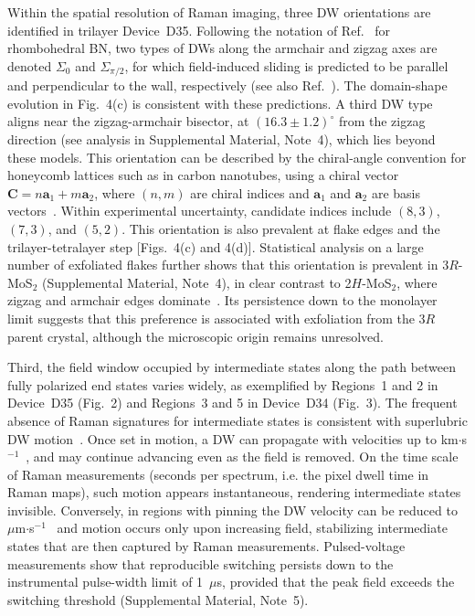 \documentclass[
reprint,
superscriptaddress,









 amsmath,amssymb,
 aps,
 prb,






]{revtex4-2}
\begin{document}
Within the spatial resolution of Raman imaging, three DW orientations are identified in trilayer Device~D35. Following the notation of Ref.~\cite{Ke2025} for rhombohedral BN, two types of DWs along the armchair and zigzag axes are denoted $\Sigma_{0}$ and $\Sigma_{\pi/2}$, for which field-induced sliding is predicted to be parallel and perpendicular to the wall, respectively (see also Ref.~\cite{He2024}). The domain-shape evolution in Fig.~4(c) is consistent with these predictions. A third DW type aligns near the zigzag-armchair bisector, at $(16.3\pm 1.2)^{\circ}$ from the zigzag direction (see analysis in Supplemental Material, Note~4), which lies beyond these models. This orientation can be described by the chiral-angle convention for honeycomb lattices such as in carbon nanotubes, using a chiral vector $\mathbf{C}=n\mathbf{a}_1+m\mathbf{a}_2$, where $(n,m)$ are chiral indices and $\mathbf{a}_1$ and $\mathbf{a}_2$ are basis vectors~\cite{Dresselhaus2001}. Within experimental uncertainty, candidate indices include $(8,3)$, $(7,3)$, and $(5,2)$. This orientation is also prevalent at flake edges and the trilayer-tetralayer step [Figs.~4(c) and 4(d)]. Statistical analysis on a large number of exfoliated flakes further shows that this orientation is prevalent in 3$R$-MoS$_2$ (Supplemental Material, Note~4), in clear contrast to 2$H$-MoS$_2$, where zigzag and armchair edges dominate~\cite{Guo2016}. Its persistence down to the monolayer limit suggests that this preference is associated with exfoliation from the 3$R$ parent crystal, although the microscopic origin remains unresolved.

Third, the field window occupied by intermediate states along the path between fully polarized end states varies widely, as exemplified by Regions~1 and 2 in Device~D35 (Fig.~2) and Regions~3 and 5 in Device~D34 (Fig.~3). The frequent absence of Raman signatures for intermediate states is consistent with superlubric DW motion~\cite{Yeo2025}. Once set in motion, a DW can propagate with velocities up to km$\cdot$s$^{-1}$~\cite{Ke2025,Shi2025,Bai2025,Liang2025PRX}, and may continue advancing even as the field is removed. On the time scale of Raman measurements (seconds per spectrum, i.e. the pixel dwell time in Raman maps), such motion appears instantaneous, rendering intermediate states invisible. Conversely, in regions with pinning the DW velocity can be reduced to $\mu$m$\cdot$s$^{-1}$~\cite{Ko2023} and motion occurs only upon increasing field, stabilizing intermediate states that are then captured by Raman measurements. Pulsed-voltage measurements show that reproducible switching persists down to the instrumental pulse-width limit of 1~$\mu$s, provided that the peak field exceeds the switching threshold (Supplemental Material, Note~5).
\end{document}
